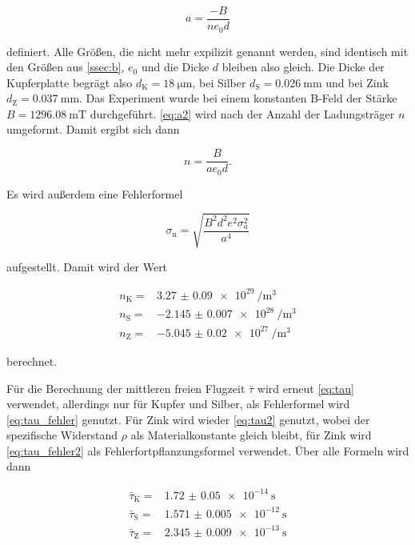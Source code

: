 \begin{equation}
    a = \frac{-B}{n e_0 d}
    \label{eq:a2}
\end{equation}

definiert.
Alle Größen, die nicht mehr expilizit genannt werden, sind identisch mit den Größen aus \autoref{ssec:b}, $e_0$ und die Dicke $d$ bleiben also gleich.
Die Dicke der Kupferplatte begrägt also $d_\text{K} = \SI{18}{\micro\meter}$, bei Silber $d_\text{S} = \SI{0.026}{\milli\meter}$ und bei Zink $d_\text{Z} = \SI{0.037}{\milli\meter}$.
Das Experiment wurde bei einem konstanten B-Feld der Stärke $B = \SI{1296.08}{\milli\tesla}$ durchgeführt.
\autoref{eq:a2} wird nach der Anzahl der Ladungsträger $n$ umgeformt.
Damit ergibt sich dann

\begin{equation}
    n = \frac{B}{a e_0 d}.
    \label{eq:n2}
\end{equation}

Es wird außerdem eine Fehlerformel 

\begin{equation}
    \sigma _\text{n} = \sqrt{\frac {B^{2} d^{2} e^{2} \sigma_{a}^{2} }{a^{4}}}
    \label{eq:n2_fehler}
\end{equation}

aufgestellt.
Damit wird der Wert

\begin{align}
    n_\text{K} =& \SI{3.27(9)e29}{\per\cubic\meter}\\
    n_\text{S} =& \SI{-2.145(7)e28}{\per\cubic\meter}\\
    n_\text{Z} =& \SI{-5.045(20)e27}{\per\cubic\meter}
    \label{eq:n2_wert}
\end{align}

berechnet.

Für die Berechnung der mittleren freien Flugzeit $\bar{\tau}$ wird erneut \autoref{eq:tau} verwendet, allerdings nur für Kupfer und Silber, als Fehlerformel wird \autoref{eq:tau_fehler} genutzt.
Für Zink wird wieder \autoref{eq:tau2} genutzt, wobei der spezifische Widerstand $\rho$ als Materialkonstante gleich bleibt, für Zink wird \autoref{eq:tau_fehler2} als Fehlerfortpflanzungsformel verwendet.
Über alle Formeln wird dann 

\begin{align}
    \bar{\tau}_\text{K} =& \SI{1.72(5)e-14}{\second} \\
    \bar{\tau}_\text{S} =& \SI{1.571(5)e-12}{\second} \\
    \bar{\tau}_\text{Z} =& \SI{2.345(9)e-13}{\second}
    \label{eq:tau2_werte}
\end{align}

